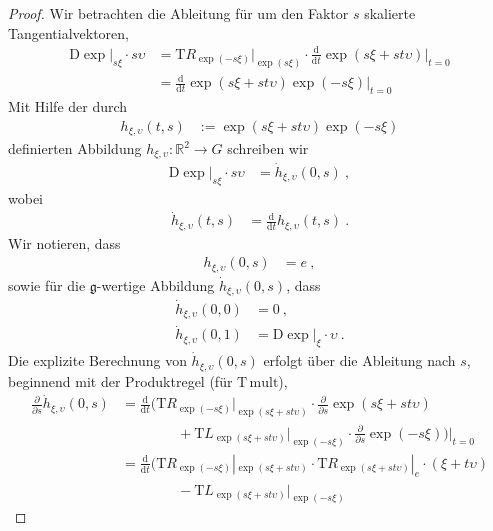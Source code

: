 \documentclass[10pt,a4paper]{article}
\theoremstyle{mytheorem}
\theoremstyle{mydefinition}
\newcommand{\dt}{\mathrm{d}}
\newcommand{\Dt}{\mathrm{D}}
\newcommand{\Tt}{\mathrm{T}}
\newcommand{\fg}{\mathfrak{g}}
\begin{document}
\begin{proof}
Wir betrachten die Ableitung für um den Faktor $s$ skalierte Tangentialvektoren,
\begin{align*}
	\Dt\exp|_{s\xi} \cdot s\upsilon
	&=
	\Tt R_{\exp(-s\xi)}|_{\exp(s\xi)}
	\cdot
	\frac{\dt}{\dt t}
		\exp(s\xi + st\upsilon)
	\Big|_{t=0}
	\nonumber\\
	&=
	\frac{\dt}{\dt t}
		\exp(s\xi + st\upsilon)
		\exp(-s\xi)
	\Big|_{t=0}
\end{align*}
Mit Hilfe der durch 
\begin{align*}
	h_{\xi,\upsilon}(t, s)
	&:= 
	\exp(s\xi + st\upsilon)\exp(-s\xi)
\end{align*}
definierten Abbildung $h_{\xi,\upsilon}:\mathbb{R}^2\rightarrow G$ schreiben wir
\begin{align*}
	\Dt\exp|_{s\xi} \cdot s\upsilon
	&= \dot{h}_{\xi, \upsilon}(0, s)
	\ ,
\end{align*}
wobei
\begin{align*}
	\dot{h}_{\xi, \upsilon}(t, s)
	&= \frac{\dt}{\dt t} h_{\xi, \upsilon}(t, s)
	\ .
\end{align*}
Wir notieren, dass
\begin{align*}
	h_{\xi,\upsilon}(0, s)
	&= e
	\ ,
\end{align*}
sowie für die $\fg$-wertige Abbildung $\dot{h}_{\xi, \upsilon}(0, s)$, dass
\begin{align*}
	\dot{h}_{\xi, \upsilon}(0, 0)
	&= 0
	\ ,\\
	\dot{h}_{\xi, \upsilon}(0, 1)
	&= \Dt\exp|_{\xi} \cdot \upsilon
	\ .
\end{align*}
Die explizite Berechnung von $\dot{h}_{\xi, \upsilon}(0, s)$ erfolgt über die Ableitung nach $s$, beginnend mit der Produktregel (für $\Tt\,\mathrm{mult}$),
\begin{align*}
	\frac{\partial}{\partial s}
	\dot{h}_{\xi, \upsilon}(0, s)	
	&=
	\frac{\dt}{\dt t}	
	\Big(
		\Tt R_{\exp(-s\xi)}
		|_{\exp(s\xi + st\upsilon)}
		\cdot	
		\frac{\partial}{\partial s}\exp(s\xi + st\upsilon)
	\nonumber\\
	&\qquad\qquad+
		\Tt L_{\exp(s\xi + st\upsilon)}
		|_{\exp(-s\xi)}		
		\cdot			
		\frac{\partial}{\partial s}
		\exp(-s\xi)
	\Big)	
	\Big|_{t=0}
	\nonumber\\	
	&=
	\frac{\dt}{\dt t}	
	\Big(
		\Tt R_{\exp(-s\xi)}
		|_{\exp(s\xi + st\upsilon)}
		\cdot	
		\Tt R_{\exp(s\xi + st\upsilon)}
		|_e
		\cdot
		(\xi + t\upsilon)
	\nonumber\\
	&\qquad\qquad-
		\Tt L_{\exp(s\xi + st\upsilon)}
		|_{\exp(-s\xi)}	

\end{align*}
\end{proof}
\end{document}
